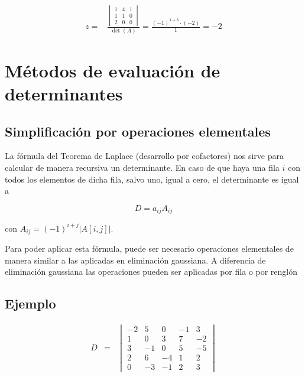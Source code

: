 \documentclass[
]{article}
\begin{document}
\begin{equation*}
    \begin{array}{cc}
      z=& \frac{\begin{vmatrix} 1 & 4 & 1 \\ 1 & 1 & 0 \\ 2 & 0 & 0  \end{vmatrix}}{\det(A)} = \frac{(-1)^{1+3}\cdot(-2)}{1} = -2
    \end{array}
  \end{equation*}

\hypertarget{muxe9todos-de-evaluaciuxf3n-de-determinantes}{%
\section{Métodos de evaluación de
determinantes}\label{muxe9todos-de-evaluaciuxf3n-de-determinantes}}

\hypertarget{simplificaciuxf3n-por-operaciones-elementales}{%
\subsection{\texorpdfstring{\textbf{Simplificación} \textbf{por}
\textbf{operaciones}
\textbf{elementales}}{Simplificación por operaciones elementales}}\label{simplificaciuxf3n-por-operaciones-elementales}}

La fórmula del Teorema de Laplace (desarrollo por cofactores) nos sirve
para calcular de manera recursiva un determinante. En caso de que haya
una fila \(i\) con todos los elementos de dicha fila, salvo uno, igual a
cero, el determinante es igual a

\[
D = a_{ij}A_{ij}
\]

con \(A_{ij}=(-1)^{i+j}|A[i,j]|\).

Para poder aplicar esta fórmula, puede ser necesario operaciones
elementales de manera similar a las aplicadas en eliminación gaussiana.
A diferencia de eliminación gaussiana las operaciones pueden ser
aplicadas por fila o por renglón

\hypertarget{ejemplo-6}{%
\subsection{Ejemplo}\label{ejemplo-6}}

\begin{equation*}
\begin{array}{ccc}
D &= & \begin{vmatrix} 
          -2 & 5 & 0 & -1 & 3 \\ 
           1 & 0 & 3 & 7 & -2 \\
           3 & -1& 0 & 5 & -5 \\
           2 & 6 &-4 & 1 & 2  \\
           0 &-3 &-1 & 2 & 3
        \end{vmatrix}
\end{array}
\end{equation*}
\end{document}
